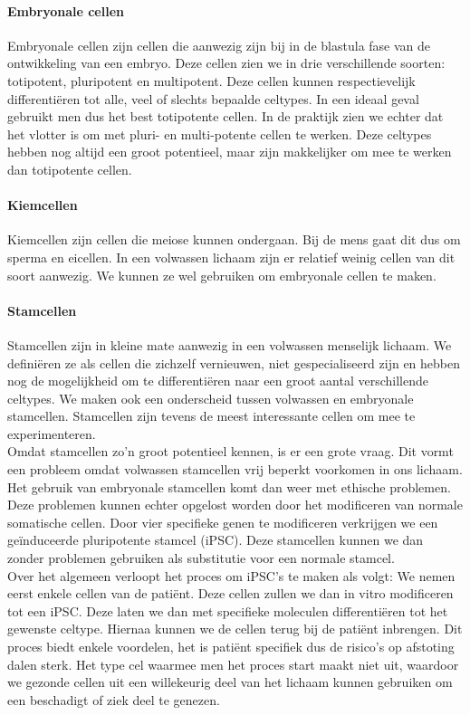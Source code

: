 \documentclass[a4paper,kul]{kulakarticle} %
\begin{document}
\paragraph{Embryonale cellen}
Embryonale cellen zijn cellen die aanwezig zijn bij in de blastula fase van de ontwikkeling van een embryo. Deze cellen zien we in drie verschillende soorten: totipotent, pluripotent en multipotent. Deze cellen kunnen respectievelijk differentiëren tot alle, veel of slechts bepaalde celtypes. In een ideaal geval gebruikt men dus het best totipotente cellen. In de praktijk zien we echter dat het vlotter is om met pluri- en multi-potente cellen te werken. Deze celtypes hebben nog altijd een groot potentieel, maar zijn makkelijker om mee te werken dan totipotente cellen.   
\paragraph{Kiemcellen}
Kiemcellen zijn cellen die meiose kunnen ondergaan. Bij de mens gaat dit dus om sperma en eicellen. In een volwassen lichaam zijn er relatief weinig cellen van dit soort aanwezig. We kunnen ze wel gebruiken om embryonale cellen te maken. 
\paragraph{Stamcellen}
Stamcellen zijn in kleine mate aanwezig in een volwassen menselijk lichaam. We definiëren ze als cellen die zichzelf vernieuwen, niet gespecialiseerd zijn en hebben nog de mogelijkheid om te differentiëren naar een groot aantal verschillende celtypes. We maken ook een onderscheid tussen volwassen en embryonale stamcellen. Stamcellen zijn tevens de meest interessante cellen om mee te experimenteren.
\\
Omdat stamcellen zo'n groot potentieel kennen, is er een grote vraag. Dit vormt een probleem omdat volwassen stamcellen vrij beperkt voorkomen in ons lichaam. Het gebruik van embryonale stamcellen komt dan weer met ethische problemen. Deze problemen kunnen echter opgelost worden door het modificeren van normale somatische cellen. Door vier specifieke genen te modificeren verkrijgen we een geïnduceerde pluripotente stamcel (iPSC). Deze stamcellen kunnen we dan zonder problemen gebruiken als substitutie voor een normale stamcel.
\\
Over het algemeen verloopt het proces om iPSC's te maken als volgt: We nemen eerst enkele cellen van de patiënt. Deze cellen zullen we dan in vitro modificeren tot een iPSC. Deze laten we dan met specifieke moleculen differentiëren tot het gewenste celtype. Hiernaa kunnen we de cellen terug bij de patiënt inbrengen. Dit proces biedt enkele voordelen, het is patiënt specifiek dus de risico's op afstoting dalen sterk. Het type cel waarmee men het proces start maakt niet uit, waardoor we gezonde cellen uit een willekeurig deel van het lichaam kunnen gebruiken om een beschadigt of ziek deel te genezen. 
\end{document}
